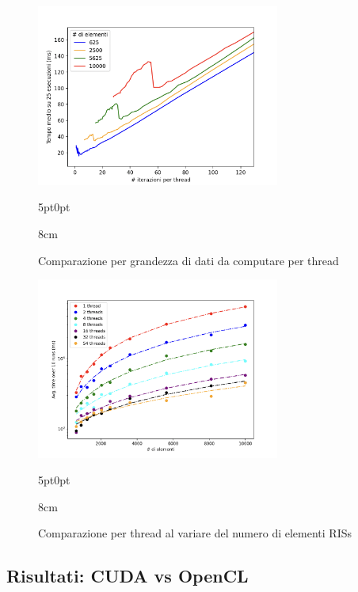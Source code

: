 \begin{figure}[!ht]
  \begin{minipage}[t]{0.5\linewidth}
    \centering
    \includegraphics[width=8cm]{images/results/gain-jobs-per-thread.png}
    \begin{adjustwidth}
      {5pt}{0pt}
      \begin{varwidth}
        {8cm}
        \caption{Comparazione per grandezza di dati da computare per thread}
        \label{fig:jobs-per-thread}
      \end{varwidth}
    \end{adjustwidth}
  \end{minipage}
  \begin{minipage}[t]{0.5\linewidth}
    \centering
    \includegraphics[width=8cm]{images/results/gain-thread-over-elem.png}
    \begin{adjustwidth}
      {5pt}{0pt}
      \begin{varwidth}
        {8cm}
        \caption{Comparazione per thread al variare del numero di elementi RISs}
        \label{fig:thread-over-elem}
      \end{varwidth}
    \end{adjustwidth}
  \end{minipage}
\end{figure}

\subsection{Risultati: CUDA vs OpenCL}
\label{subsec:risultati-cuda-opencl}

